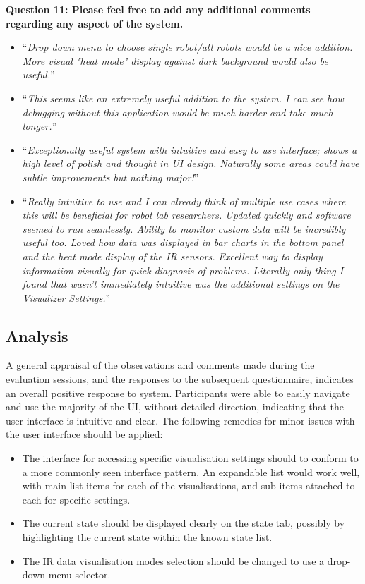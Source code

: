 \noindent\textbf{Question 11: Please feel free to add any additional comments regarding any aspect of the system.}
\begin{itemize}
 \item ``\textit{Drop down menu to choose single robot/all robots would be a nice addition. More visual "heat mode" display against dark background would also be useful.}''
 \item ``\textit{This seems like an extremely useful addition to the system. I can see how debugging without this application would be much harder and take much longer.}''
 \item ``\textit{Exceptionally useful system with intuitive and easy to use interface; shows a high level of polish and thought in UI design. Naturally some areas could have subtle improvements but nothing major!}''
 \item ``\textit{Really intuitive to use and I can already think of multiple use cases where this will be beneficial for robot lab researchers. Updated quickly and software seemed to run seamlessly. Ability to monitor custom data will be incredibly useful too. Loved how data was displayed in bar charts in the bottom panel and the heat mode display of the IR sensors. Excellent way to display information visually for quick diagnosis of problems. Literally only thing I found that wasn't immediately intuitive was the additional settings on the Visualizer Settings.}''
\end{itemize}


\subsection{Analysis}
A general appraisal of the observations and comments made during the evaluation sessions, and the responses to the subsequent questionnaire, indicates an overall positive response to system. Participants were able to easily navigate and use the majority of the UI, without detailed direction, indicating that the user interface is intuitive and clear. The following remedies for minor issues with the user interface should be applied:

\begin{itemize}
 \item The interface for accessing specific visualisation settings should to conform to a more commonly seen interface pattern. An expandable list would work well, with main list items for each of the visualisations, and sub-items attached to each for specific settings.
 \item The current state should be displayed clearly on the state tab, possibly by highlighting the current state within the known state list.
 \item The IR data visualisation modes selection should be changed to use a drop-down menu selector.
\end{itemize}


